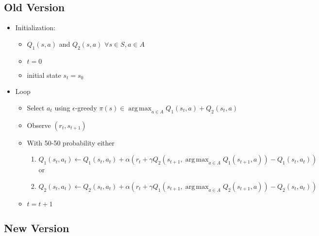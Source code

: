 \documentclass[11pt,a4paper,ngerman]{article}
\DeclareMathOperator*{\argmax}{arg\,max}
\begin{document}
\subsection{Old Version}
\begin{itemize}
    \item Initialization:
    \begin{itemize}
        \item $Q_1(s,a)$ and $Q_2(s,a)$ $\forall s \in S, a\in A$
        \item $t= 0$
        \item initial state $s_t = s_0$
    \end{itemize}
    \item Loop
    \begin{itemize}
        \item Select $a_t$ using $\epsilon$-greedy $\pi(s) \in \argmax_{a \in A} Q_1(s_t, a) + Q_2(s_t , a)$
        \item Observe $(r_t, s_{t+1})$
        \item With 50-50 probability either
        \begin{enumerate}
            \item $Q_1(s_t, a_t) \gets Q_1(s_t, a_t) + \alpha (r_t +\gamma Q_2(s_{t+1}, \argmax_{a \in A} Q_1(s_{t+1},a) ) - Q_1(s_t, a_t))$\\
            or
            \item $Q_2(s_t, a_t) \gets Q_2(s_t, a_t) + \alpha (r_t +\gamma Q_1(s_{t+1}, \argmax_{a \in A} Q_2(s_{t+1},a) ) - Q_2(s_t, a_t))$
        \end{enumerate}
        \item $t = t + 1 $
    \end{itemize}
\end{itemize}
\subsection{New Version}
\end{document}
